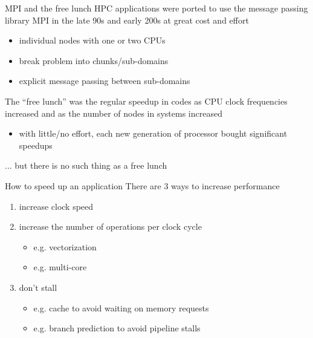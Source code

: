 \documentclass[aspectratio=43]{beamer}
\begin{document}
\begin{frame}[fragile]{}
    \begin{info}{MPI and the free lunch}
        HPC applications were ported to use the message passing library MPI in the late 90s and early 200s at great cost and effort
        \begin{itemize}
            \item individual nodes with one or two CPUs
            \item break problem into chunks/sub-domains
            \item explicit message passing between sub-domains
        \end{itemize}
        The ``free lunch'' was the regular speedup in codes as CPU clock frequencies increased and as the number of nodes in systems increased
        \begin{itemize}
            \item with little/no effort, each new generation of processor bought significant speedups
        \end{itemize}
    \end{info}

    \centering ...  but there is no such thing as a free lunch
\end{frame}

\begin{frame}[fragile]{}
    \begin{info}{How to speed up an application}
        There are 3 ways to increase performance
        \begin{enumerate}
            \item increase clock speed
            \item increase the number of operations per clock cycle
            \begin{itemize}
                \item e.g. vectorization
                \item e.g. multi-core
            \end{itemize}
            \item don't stall
            \begin{itemize}
                \item e.g. cache to avoid waiting on memory requests
                \item e.g. branch prediction to avoid pipeline stalls
            \end{itemize}
        \end{enumerate}
    \end{info}
\end{frame}
\end{document}
